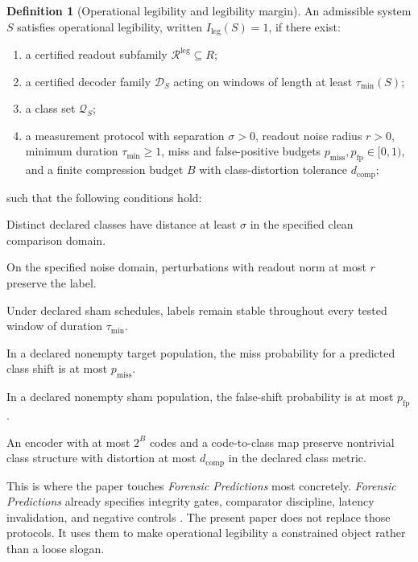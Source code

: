 \documentclass[11pt,a4paper]{article}
\theoremstyle{definition}
\newtheorem{definition}[theorem]{Definition}
\newcommand{\Ileg}{I_{\mathrm{leg}}}
\newcommand{\Read}{\mathscr{R}}
\newcommand{\Dec}{\mathscr{D}}
\newcommand{\Class}{\mathscr{Q}}
\begin{document}
\begin{definition}[Operational legibility and legibility margin]\label{def:ileg}
An admissible system $S$ satisfies operational legibility, written $\Ileg(S)=1$, if there exist:
\begin{enumerate}[leftmargin=1.5em]
\item a certified readout subfamily $\Read^{\mathrm{leg}} \subseteq R$;
\item a certified decoder family $\Dec_S$ acting on windows of length at least $\tau_{\min}(S)$;
\item a class set $\Class_S$;
\item a measurement protocol with separation $\sigma>0$, readout noise radius $r>0$, minimum duration $\tau_{\min}\ge1$, miss and false-positive budgets $p_{\mathrm{miss}},p_{\mathrm{fp}}\in[0,1)$, and a finite compression budget $B$ with class-distortion tolerance $d_{\mathrm{comp}}$;
\end{enumerate}
such that the following conditions hold:
\begin{description}[leftmargin=1.7em]
\item[(L1) Separability] Distinct declared classes have distance at least $\sigma$ in the specified clean comparison domain.
\item[(L2) Noise robustness] On the specified noise domain, perturbations with readout norm at most $r$ preserve the label.
\item[(L3) Persistence window] Under declared sham schedules, labels remain stable throughout every tested window of duration $\tau_{\min}$.
\item[(L4) Intervention fidelity] In a declared nonempty target population, the miss probability for a predicted class shift is at most $p_{\mathrm{miss}}$.
\item[(L5) Negative controls] In a declared nonempty sham population, the false-shift probability is at most $p_{\mathrm{fp}}$.
\item[(L6) Structured compressibility] An encoder with at most $2^B$ codes and a code-to-class map preserve nontrivial class structure with distortion at most $d_{\mathrm{comp}}$ in the declared class metric.
\end{description}
\end{definition}

This is where the paper touches \textit{Forensic Predictions} most concretely. \textit{Forensic Predictions} already specifies integrity gates, comparator discipline, latency invalidation, and negative controls \cite{paper4}. The present paper does not replace those protocols. It uses them to make operational legibility a constrained object rather than a loose slogan.
\end{document}
